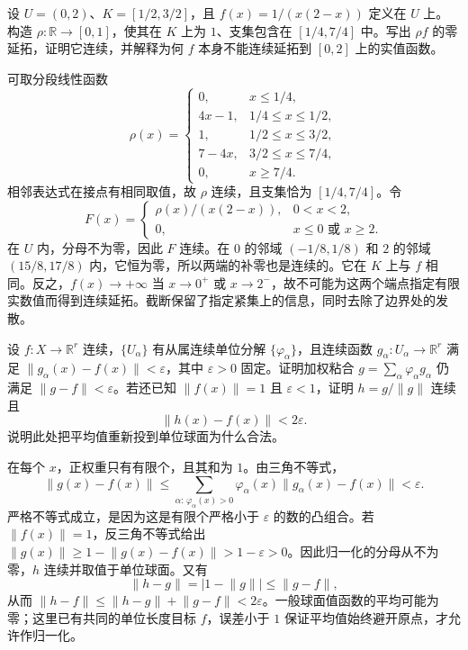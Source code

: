\begin{exercise}\label{g1:ex:explicit-cutoff-extension}
	设 \(U=(0,2)\)、\(K=[1/2,3/2]\)，且 \(f(x)=1/(x(2-x))\) 定义在 \(U\) 上。构造 \(\rho:\mathbb R\rightarrow[0,1]\)，使其在 \(K\) 上为 \(1\)、支集包含在 \([1/4,7/4]\) 中。写出 \(\rho f\) 的零延拓，证明它连续，并解释为何 \(f\) 本身不能连续延拓到 \([0,2]\) 上的实值函数。
\end{exercise}
\begin{solution}
	可取分段线性函数
	\[
		\rho(x)=
		\begin{cases}
			0,&x\le1/4,\\
			4x-1,&1/4\le x\le1/2,\\
			1,&1/2\le x\le3/2,\\
			7-4x,&3/2\le x\le7/4,\\
			0,&x\ge7/4.
		\end{cases}
	\]
	相邻表达式在接点有相同取值，故 \(\rho\) 连续，且支集恰为 \([1/4,7/4]\)。令
	\[
		F(x)=
		\begin{cases}
			\rho(x)/(x(2-x)),&0<x<2,\\
			0,&x\le0\text{ 或 }x\ge2.
		\end{cases}
	\]
	在 \(U\) 内，分母不为零，因此 \(F\) 连续。在 \(0\) 的邻域 \((-1/8,1/8)\) 和 \(2\) 的邻域 \((15/8,17/8)\) 内，它恒为零，所以两端的补零也是连续的。它在 \(K\) 上与 \(f\) 相同。反之，\(f(x)\to+\infty\) 当 \(x\to0^+\) 或 \(x\to2^-\)，故不可能为这两个端点指定有限实数值而得到连续延拓。截断保留了指定紧集上的信息，同时去除了边界处的发散。
\end{solution}

\begin{exercise}\label{g1:ex:partition-approximation}
	设 \(f:X\rightarrow\mathbb R^r\) 连续，\(\{U_\alpha\}\) 有从属连续单位分解 \(\{\varphi_\alpha\}\)，且连续函数 \(g_\alpha:U_\alpha\rightarrow\mathbb R^r\) 满足 \(\lVert g_\alpha(x)-f(x)\rVert<\varepsilon\)，其中 \(\varepsilon>0\) 固定。证明加权粘合 \(g=\sum_\alpha\varphi_\alpha g_\alpha\) 仍满足 \(\lVert g-f\rVert<\varepsilon\)。若还已知 \(\lVert f(x)\rVert=1\) 且 \(\varepsilon<1\)，证明 \(h=g/\lVert g\rVert\) 连续且
	\[
		\lVert h(x)-f(x)\rVert<2\varepsilon.
	\]
	说明此处把平均值重新投到单位球面为什么合法。
\end{exercise}
\begin{solution}
	在每个 \(x\)，正权重只有有限个，且其和为 \(1\)。由三角不等式，
	\[
		\lVert g(x)-f(x)\rVert
		\le\sum_{\alpha:\,\varphi_\alpha(x)>0}\varphi_\alpha(x)
		\lVert g_\alpha(x)-f(x)\rVert<\varepsilon.
	\]
	严格不等式成立，是因为这是有限个严格小于 \(\varepsilon\) 的数的凸组合。若 \(\lVert f(x)\rVert=1\)，反三角不等式给出 \(\lVert g(x)\rVert\ge1-\lVert g(x)-f(x)\rVert>1-\varepsilon>0\)。因此归一化的分母从不为零，\(h\) 连续并取值于单位球面。又有
	\[
		\lVert h-g\rVert=|1-\lVert g\rVert|
		\le\lVert g-f\rVert,
	\]
	从而 \(\lVert h-f\rVert\le\lVert h-g\rVert+\lVert g-f\rVert<2\varepsilon\)。一般球面值函数的平均可能为零；这里已有共同的单位长度目标 \(f\)，误差小于 \(1\) 保证平均值始终避开原点，才允许作归一化。
\end{solution}

